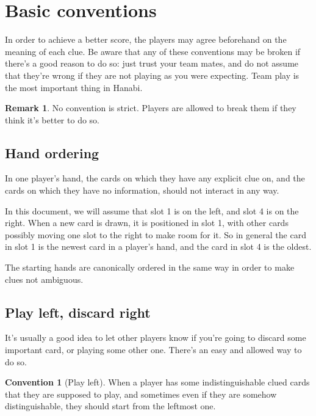 \documentclass[a4paper]{article}
\theoremstyle{plain}
\theoremstyle{definition}
\newtheorem{remark}[theorem]{Remark}
\newtheorem{convention}[theorem]{Convention}
\begin{document}
\section{Basic conventions}

In order to achieve a better score, the players may agree beforehand on the meaning of each clue. Be aware that any of these conventions may be broken if there's a good reason to do so: just trust your team mates, and do not assume that they're wrong if they are not playing as you were expecting. Team play is the most important thing in Hanabi.

\begin{remark}
	No convention is strict. Players are allowed to break them if they think it's better to do so.
\end{remark}

\subsection{Hand ordering}

In one player's hand, the cards on which they have any explicit clue on, and the cards on which they have no information, should not interact in any way.

In this document, we will assume that slot 1 is on the left, and slot 4 is on the right. When a new card is drawn, it is positioned in slot 1, with other cards possibly moving one slot to the right to make room for it. So in general the card in slot 1 is the newest card in a player's hand, and the card in slot 4 is the oldest.

The starting hands are canonically ordered in the same way in order to make clues not ambiguous.

\subsection{Play left, discard right}

It's usually a good idea to let other players know if you're going to discard some important card, or playing some other one. There's an easy and allowed way to do so.

\begin{convention}[Play left]
	\label{play-left}
	When a player has some indistinguishable clued cards that they are supposed to play, and sometimes even if they are somehow distinguishable, they should start from the leftmost one.
\end{convention}
\end{document}
